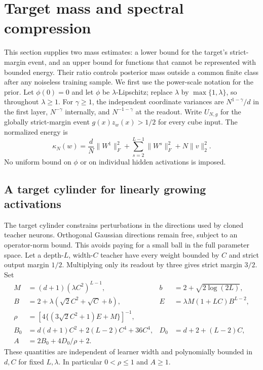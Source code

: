 \section{Target mass and spectral compression}
\label{sec:allgamma-spectral}
This section supplies two mass estimates: a lower bound for the target's
strict-margin event, and an upper bound for functions that cannot be
represented with bounded energy. Their ratio controls posterior mass
outside a common finite class after any noiseless training sample.
We first use the power-scale notation for the prior.
Let $\phi(0)=0$ and let $\phi$ be $\lambda$-Lipschitz; replace
$\lambda$ by $\max\{1,\lambda\}$, so throughout $\lambda\ge1$.
For $\gamma\ge1$, the independent coordinate variances are
$N^{1-\gamma}/d$ in the first layer, $N^{-\gamma}$ internally, and
$N^{-1-\gamma}$ at the readout. Write $U_{N,g}$ for the globally
strict-margin event $g(x)z_w(x)>1/2$ for every cube input.
The normalized energy is
\[
 \kappa_N(w)=\frac dN\|W^1\|_F^2+
 \sum_{s=2}^{L-1}\|W^s\|_F^2+N\|v\|_2^2.
\]
No uniform bound on $\phi$ or on individual hidden activations is imposed.

\subsection{A target cylinder for linearly growing activations}
The target cylinder constrains perturbations in the directions used by
cloned teacher neurons. Orthogonal Gaussian directions remain free, subject
to an operator-norm bound. This avoids paying for a small ball in the full
parameter space.
Let a depth-$L$, width-$C$ teacher have every weight bounded by $C$ and
strict output margin $1/2$. Multiplying only its readout by three gives
strict margin $3/2$. Set
\begin{align*}
 M&=(d+1)(\lambda C^2)^{L-1},&
 b&=2+\sqrt{2\log(2L)},\\
 B&=2+\lambda(\sqrt2 C^2+\sqrt C+b),&
 E&=\lambda M(1+LC)B^{L-2},\\
 \rho&=\left[4\{(3\sqrt2 C^2+1)E+M\}\right]^{-1},\\
 B_0&=d(d+1)C^2+2(L-2)C^4+36C^4,&
 D_0&=d+2+(L-2)C,\\
 A&=2B_0+4D_0/\rho+2.
\end{align*}
These quantities are independent of learner width and polynomially bounded
in $d,C$ for fixed $L,\lambda$. In particular $0<\rho\le1$ and $A\ge1$.

